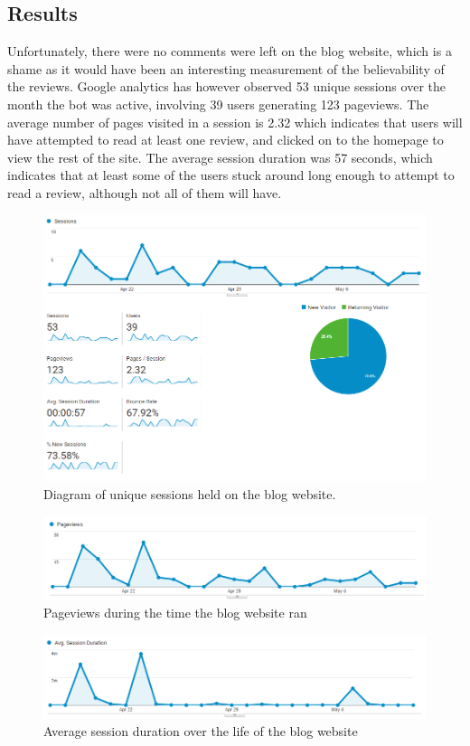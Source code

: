 \subsection{Results}
Unfortunately, there were no comments were left on the blog website, which is a shame as it would have been an interesting measurement of the believability of the reviews. Google analytics has however observed 53 unique sessions over the month the bot was active, involving 39 users generating 123 pageviews. The average number of pages visited in a session is 2.32 which indicates that users will have attempted to read at least one review, and clicked on to the homepage to view the rest of the site. The average session duration was 57 seconds, which indicates that at least some of the users stuck around long enough to attempt to read a review, although not all of them will have.\\
\begin{figure}
\centering
\includegraphics[width=0.85\linewidth]{figures/google_analytics/uniqueSessions}
\caption{Diagram of unique sessions held on the blog website.}
\label{fig:uniquesessions}
\end{figure}

\begin{figure}
\centering
\includegraphics[width=0.85\linewidth]{figures/google_analytics/pageviews}
\caption{Pageviews during the time the blog website ran}
\label{fig:pageviews}
\end{figure}
\begin{figure}
\centering
\includegraphics[width=0.85\linewidth]{figures/google_analytics/sessionDuration}
\caption{Average session duration over the life of the blog website}
\label{fig:sessionduration}
\end{figure}

